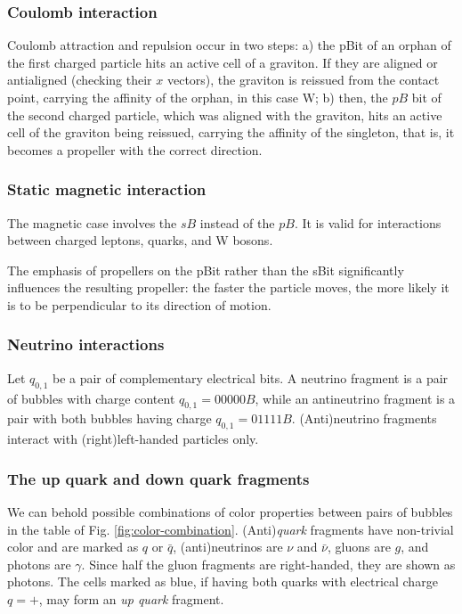 \documentclass[12pt,english]{article}
\begin{document}
\subsubsection{Coulomb interaction} \label{subsec:Coulomb-interaction}

Coulomb attraction and repulsion occur in two steps: a) the pBit of an orphan of the first charged particle hits an active cell of a graviton. If they are aligned or antialigned (checking their $x$ vectors), the graviton is reissued from the contact point, carrying the affinity of the orphan, in this case W; b) then, the $pB$ bit of the second charged particle, which was aligned with the graviton, hits an active cell of the graviton being reissued, carrying the affinity of the singleton, that is, it becomes a propeller with the correct direction.

\subsubsection{Static magnetic interaction}

The magnetic case involves the $sB$ instead of the $pB$. It is valid for interactions between charged leptons, quarks, and W bosons.

The emphasis of propellers on the pBit rather than the sBit significantly influences the resulting propeller: the faster the particle moves, the more likely it is to be perpendicular to its direction of motion.

\subsubsection{Neutrino interactions}

Let $q_{0,1}$ be a pair of complementary electrical bits. A neutrino fragment is a pair of bubbles with charge content $q_{0,1} = 00000B$, while an antineutrino fragment is a pair with both bubbles having charge $q_{0,1} = 01111B$. (Anti)neutrino fragments interact with (right)left-handed particles only.

\subsubsection{The up quark and down quark fragments}

We can behold possible combinations of color properties between pairs of bubbles in the table of Fig. \ref{fig:color-combination}. (Anti)\emph{quark} fragments have non-trivial color and are marked as $q$ or $\bar{q}$, (anti)neutrinos are $\nu$ and $\bar{\nu}$, gluons are $g$, and photons are $\gamma$. Since half the gluon fragments are right-handed, they are shown as photons. The cells marked as blue, if having both quarks with electrical charge $q=+$, may form an \emph{up quark}
fragment. 
\end{document}
